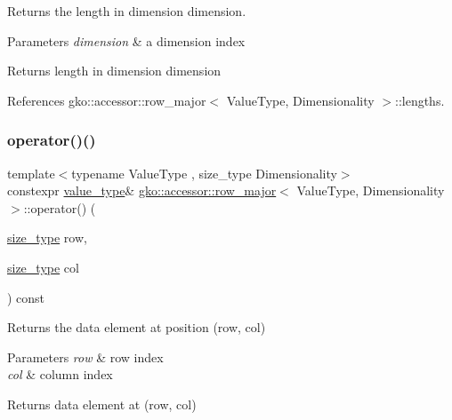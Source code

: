 Returns the length in dimension {\ttfamily dimension}. 


\begin{DoxyParams}{Parameters}
{\em dimension} & a dimension index\\
\hline
\end{DoxyParams}
\begin{DoxyReturn}{Returns}
length in dimension {\ttfamily dimension} 
\end{DoxyReturn}


References gko\+::accessor\+::row\+\_\+major$<$ Value\+Type, Dimensionality $>$\+::lengths.

\mbox{\label{classgko_1_1accessor_1_1row__major_a669d87e6198b1bdb4c915b909a61f756}} 
\subsubsection{\texorpdfstring{operator()()}{operator()()}\hspace{0.1cm}{\footnotesize\ttfamily [1/2]}}
{\footnotesize\ttfamily template$<$typename Value\+Type , size\+\_\+type Dimensionality$>$ \\
constexpr \hyperlink{classgko_1_1accessor_1_1row__major_a687bda931be92c31abf02965fa72ceba}{value\+\_\+type}\& \hyperlink{classgko_1_1accessor_1_1row__major}{gko\+::accessor\+::row\+\_\+major}$<$ Value\+Type, Dimensionality $>$\+::operator() (\begin{DoxyParamCaption}\item[{\hyperlink{namespacegko_a6e5c95df0ae4e47aab2f604a22d98ee7}{size\+\_\+type}}]{row,  }\item[{\hyperlink{namespacegko_a6e5c95df0ae4e47aab2f604a22d98ee7}{size\+\_\+type}}]{col }\end{DoxyParamCaption}) const}



Returns the data element at position (row, col) 


\begin{DoxyParams}{Parameters}
{\em row} & row index \\
\hline
{\em col} & column index\\
\hline
\end{DoxyParams}
\begin{DoxyReturn}{Returns}
data element at (row, col) 
\end{DoxyReturn}


